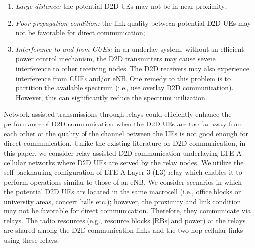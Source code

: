 \documentclass[twocolumn,10pt]{IEEEtran}
\begin{document}
\begin{enumerate} 
\item \textit{Large distance:} the potential D2D UEs may not be in near proximity;
\item \textit{Poor propagation condition:}  the link quality between potential D2D UEs may not be favorable for direct communication;
\item \textit{Interference to and from CUEs:} in an underlay system, without an efficient power control mechanism, the D2D transmitters may cause severe interference to other receiving nodes. The D2D receivers may also experience interference from CUEs and/or eNB. One remedy to this problem is to partition the available spectrum (i.e., use overlay D2D communication). However, this can significantly reduce the spectrum utilization.
\end{enumerate} 

Network-assisted transmissions through relays could efficiently enhance the performance of D2D communication when the D2D UEs are too far away from each other or the quality of the channel between the UEs is not good enough for direct communication. Unlike the existing literature on D2D communication, in this paper, we consider relay-assisted D2D communication
underlaying LTE-A cellular networks where D2D UEs are served by the relay nodes. We utilize the self-backhauling configuration of LTE-A Layer-3 (L3) relay which enables it to perform operations similar to those of an eNB. We consider scenarios in which the potential D2D UEs are located in the same macrocell (i.e., office blocks or university areas, concert halls etc.); however, the proximity and link condition may not be favorable for direct communication. Therefore, they communicate via relays. The radio resources  (e.g., resource blocks [RBs] and power) at the relays are shared among the D2D communication links and the two-hop cellular links using these relays. 
\end{document}
